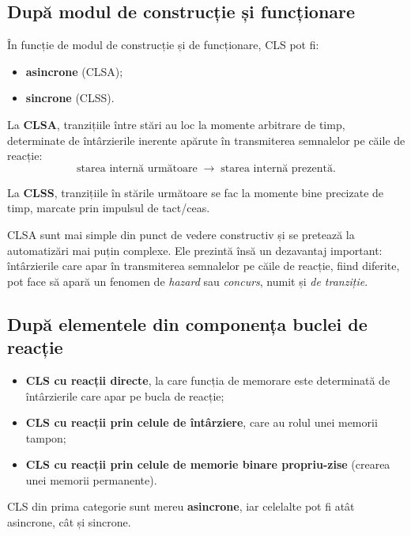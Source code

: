 \subsection{După modul de construcție și funcționare}

În funcție de modul de construcție și de funcționare, CLS pot fi:
\begin{itemize}
  \item \textbf{asincrone} (CLSA);
  \item \textbf{sincrone} (CLSS).
\end{itemize}

La \textbf{CLSA}, tranzițiile între stări au loc la momente arbitrare de timp,
determinate de întârzierile inerente apărute în transmiterea semnalelor pe căile
de reacție:
\[
  \text{starea internă următoare} \;\to\; \text{starea internă prezentă}.
\]

La \textbf{CLSS}, tranzițiile în stările următoare se fac la momente bine
precizate de timp, marcate prin impulsul de tact/ceas.

CLSA sunt mai simple din punct de vedere constructiv și se pretează la automatizări
mai puțin complexe. Ele prezintă însă un dezavantaj important: întârzierile care
apar în transmiterea semnalelor pe căile de reacție, fiind diferite, pot face să
apară un fenomen de \emph{hazard} sau \emph{concurs}, numit și \emph{de tranziție}.

\subsection{După elementele din componența buclei de reacție}

\begin{itemize}
  \item \textbf{CLS cu reacții directe}, la care funcția de memorare este
  determinată de întârzierile care apar pe bucla de reacție;
  \item \textbf{CLS cu reacții prin celule de întârziere}, care au rolul unei
  memorii tampon;
  \item \textbf{CLS cu reacții prin celule de memorie binare propriu-zise}
  (crearea unei memorii permanente).
\end{itemize}

CLS din prima categorie sunt mereu \textbf{asincrone}, iar celelalte pot fi atât
asincrone, cât și sincrone.
